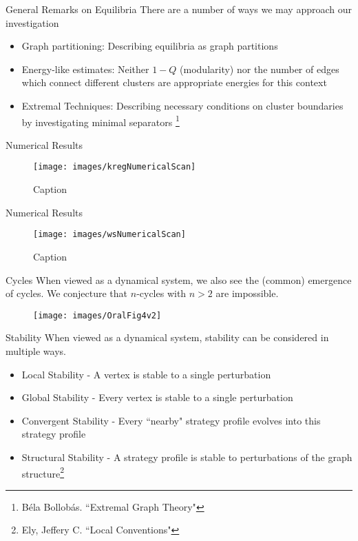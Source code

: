 \documentclass{beamer}
\begin{document}
\begin{frame}{General Remarks on Equilibria}
	There are a number of ways we may approach our investigation
	
	\begin{itemize}
		\item Graph partitioning: Describing equilibria as graph partitions
		\item Energy-like estimates: Neither $1-Q$ (modularity) nor the number of edges which connect different clusters are appropriate energies for this context
		\item Extremal Techniques: Describing necessary conditions on cluster boundaries by investigating minimal separators \footnote{B\'ela Bollob\'as. ``Extremal Graph Theory"}
	\end{itemize}
\end{frame}

\begin{frame}{Numerical Results}
	\begin{figure}
		\texttt{[image: images/kregNumericalScan]}
		\caption{Caption}
	\end{figure}
\end{frame}

\begin{frame}{Numerical Results}
	\begin{figure}
		\texttt{[image: images/wsNumericalScan]}
		\caption{Caption}
	\end{figure}
\end{frame}

\begin{frame}{Cycles}
	When viewed as a dynamical system, we also see the (common) emergence of cycles. We conjecture that $n$-cycles with $n>2$ are impossible. 
	\begin{figure}
		\texttt{[image: images/OralFig4v2]}
	\end{figure} 
\end{frame}

\begin{frame}{Stability}
	When viewed as a dynamical system, stability can be considered in multiple ways.
	\begin{itemize}
		\item Local Stability - A vertex is stable to a single perturbation
		\item Global Stability - Every vertex is stable to a single perturbation
		\item Convergent Stability - Every ``nearby" strategy profile evolves into this strategy profile
		\item Structural Stability - A strategy profile is stable to perturbations of the graph structure\footnote{Ely, Jeffery C. ``Local Conventions"}
	\end{itemize}
\end{frame}
\end{document}
